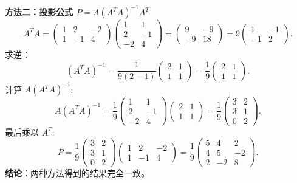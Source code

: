 \begin{exer}
\\
\textbf{方法二：投影公式 $P = A(A^T A)^{-1} A^T$}
$$ A^T A = \begin{pmatrix} 1 & 2 & -2 \\ 1 & -1 & 4 \end{pmatrix} \begin{pmatrix} 1 & 1 \\ 2 & -1 \\ -2 & 4 \end{pmatrix} = \begin{pmatrix} 9 & -9 \\ -9 & 18 \end{pmatrix} = 9 \begin{pmatrix} 1 & -1 \\ -1 & 2 \end{pmatrix}. $$
求逆：
$$ (A^T A)^{-1} = \frac{1}{9(2-1)} \begin{pmatrix} 2 & 1 \\ 1 & 1 \end{pmatrix} = \frac{1}{9} \begin{pmatrix} 2 & 1 \\ 1 & 1 \end{pmatrix}. $$
计算 $A(A^T A)^{-1}$:
$$ A(A^T A)^{-1} = \frac{1}{9} \begin{pmatrix} 1 & 1 \\ 2 & -1 \\ -2 & 4 \end{pmatrix} \begin{pmatrix} 2 & 1 \\ 1 & 1 \end{pmatrix} = \frac{1}{9} \begin{pmatrix} 3 & 2 \\ 3 & 1 \\ 0 & 2 \end{pmatrix}. $$
最后乘以 $A^T$:
$$ P = \frac{1}{9} \begin{pmatrix} 3 & 2 \\ 3 & 1 \\ 0 & 2 \end{pmatrix} \begin{pmatrix} 1 & 2 & -2 \\ 1 & -1 & 4 \end{pmatrix} = \frac{1}{9} \begin{pmatrix} 5 & 4 & 2 \\ 4 & 5 & -2 \\ 2 & -2 & 8 \end{pmatrix}. $$
\textbf{结论}：两种方法得到的结果完全一致。


\end{exer}
